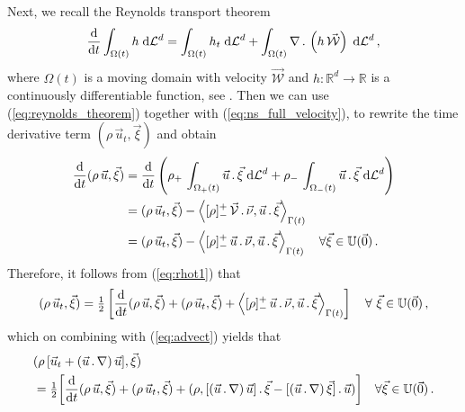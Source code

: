 \documentclass[a4paper,12pt,onecolumn]{article}
\newcommand{\R}{\mathbb R}
\newcommand{\W}{\vec{\mathcal W}}
\newcommand{\dL}[1]{\;{\rm d}{\cal L}^{#1}} %
\newcommand{\uspace}[1]{\mathbb{U}(\vec{#1})}
\newcommand{\ddt}{\frac{\rm d}{{\rm d}t}}
\newcommand{\V}{\vec{\mathcal{V}}} %
\begin{document}
Next, we recall the Reynolds transport theorem
\begin{equation}\label{eq:reynolds_theorem}
\ddt \int_{\Omega(t)} h\dL{d}=\int_{\Omega(t)} h_t \dL{d} +
\int_{\Omega(t)} \nabla\,.\,\left(h\,\W\right)\dL{d}\,,
\end{equation}
where $\Omega(t)$ is a moving domain with velocity $\W$ and $h:\R^d\to\R$ is a
continuously differentiable function, see \cite{Aris89}. Then we can use
(\ref{eq:reynolds_theorem}) together with (\ref{eq:ns_full_velocity}), to
rewrite the time derivative term $(\rho\,\vec u_t,\vec \xi)$ and obtain
\begin{align}\label{eq:rhot1}
\ddt(\rho \,\vec u, \vec \xi) & =
\ddt\left(\rho_+\,\int_{\Omega_+(t)} \vec u \,.\,\vec \xi \dL{d}
+ \rho_-\,\int_{\Omega_-(t)} \vec u\,.\,\vec \xi \dL{d}  \right) \nonumber \\
& =  (\rho\,\vec u_t, \vec \xi)
-\left\langle [\rho]_-^+\,\V\,.\,\vec\nu, \vec u \,.\,\vec \xi
\right\rangle_{\Gamma(t)} \nonumber \\
&= (\rho\,\vec u_t, \vec \xi)- \left\langle [\rho]_-^+\,\vec u\,.\,\vec \nu,
\vec u \,.\,\vec \xi \right\rangle_{\Gamma(t)}
\quad \forall \vec \xi \in \uspace 0\,.
\end{align}
Therefore, it follows from (\ref{eq:rhot1}) that
\begin{equation*}
(\rho\,\vec u_t, \vec \xi) =
\tfrac{1}{2} \left[
\ddt (\rho\,\vec u,\vec \xi) + (\rho\,\vec u_t, \vec \xi)
+ \left\langle [\rho]_-^+\,\vec u\,.\,\vec \nu,
\vec u \,.\,\vec \xi \right\rangle_{\Gamma(t)}
\right]
\quad \forall\ \vec \xi \in \uspace 0\,,
\end{equation*}
which on combining with (\ref{eq:advect}) yields that
\begin{align} \label{eq:rhot3}
& (\rho\,[\vec u_t + (\vec u\,.\,\nabla)\,\vec u], \vec \xi) \nonumber \\
& = \tfrac{1}{2}\bigg[ \ddt (\rho\,\vec u, \vec \xi)
+ (\rho\,\vec u_t, \vec \xi) + (\rho, [(\vec u\,.\,\nabla)\,\vec u]\,.\,\vec \xi
- [(\vec u\,.\,\nabla)\,\vec \xi]\,.\,\vec u) \bigg]
\quad \forall \vec \xi \in \uspace 0\,.
\end{align}
\end{document}
